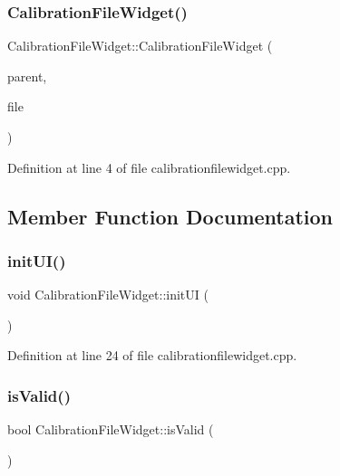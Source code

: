 \subsubsection{\texorpdfstring{CalibrationFileWidget()}{CalibrationFileWidget()}}
{\footnotesize\ttfamily Calibration\+File\+Widget\+::\+Calibration\+File\+Widget (\begin{DoxyParamCaption}\item[{Q\+Widget $\ast$}]{parent,  }\item[{\mbox{\hyperlink{class_calibration_file}{Calibration\+File}} $\ast$}]{file }\end{DoxyParamCaption})}



Definition at line 4 of file calibrationfilewidget.\+cpp.



\subsection{Member Function Documentation}
\mbox{\label{class_calibration_file_widget_ad74e3ac71cbd7ff83ebb17bc640c1ab0}} 
\subsubsection{\texorpdfstring{initUI()}{initUI()}}
{\footnotesize\ttfamily void Calibration\+File\+Widget\+::init\+UI (\begin{DoxyParamCaption}{ }\end{DoxyParamCaption})}



Definition at line 24 of file calibrationfilewidget.\+cpp.

\mbox{\label{class_calibration_file_widget_a0215ec48be28bf38472d6bfa3ed8a070}} 
\subsubsection{\texorpdfstring{isValid()}{isValid()}}
{\footnotesize\ttfamily bool Calibration\+File\+Widget\+::is\+Valid (\begin{DoxyParamCaption}{ }\end{DoxyParamCaption})\hspace{0.3cm}{\ttfamily [inline]}}




